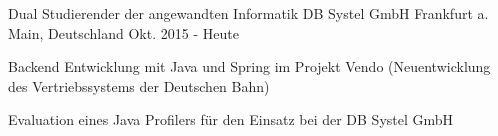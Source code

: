

\begin{cventries}

  \cventry
    {Dual Studierender der angewandten Informatik} %
    {DB Systel GmbH} %
    {Frankfurt a. Main, Deutschland} %
    {Okt. 2015 - Heute} %
    {
      \begin{cvitems} %
        \item {Backend Entwicklung mit Java und Spring im Projekt Vendo (Neuentwicklung des Vertriebssystems der Deutschen Bahn)}
        \item {Evaluation eines Java Profilers für den Einsatz bei der DB Systel GmbH}
      \end{cvitems}
    }

\end{cventries}

